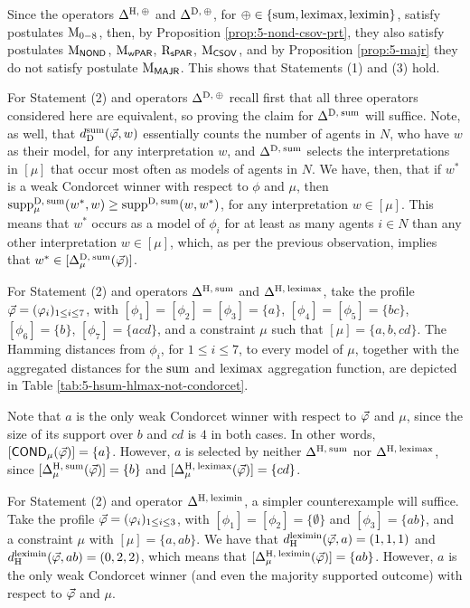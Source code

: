 \begin{prf*}{}{}%
	Since the operators $\me^{\hamming,\:\agg}$ 
	and $\me^{\drastic,\:\agg}$, 
	for $\agg\in\{\ssum,\leximax,\leximin\}$, 
	satisfy postulates $\ppm{0-8}$, then,
	by Proposition \ref{prop:5-nond-csov-prt}, they 
	also satisfy postulates $\ppm{\NOND}$, $\ppm{\WPRT}$, $\ppr{\SPRT}$, $\ppm{\CSOV}$,
	and by Proposition \ref{prop:5-majr} they do not satisfy 
	postulate $\ppm{\MAJR}$.
	This shows that Statements (1) and (3) hold.

	For Statement (2) and operators $\me^{\drastic,\:\agg}$ recall first that 
	all three operators considered here are equivalent,
	so proving the claim for $\me^{\drastic,\:\ssum}$ will suffice. 
	Note, as well, that $\dd_{\drastic}^{\ssum}(\P,w)$ essentially 
	counts the number of agents in $N$,
	who have $w$ as their model, for any interpretation $w$,
	and $\me^{\drastic,\:\ssum}$ selects the interpretations in $[\mu]$
	that occur most often as models of agents in $N$.
	We have, then, that if $w^{\ast}$ is a weak Condorcet winner with respect 
	to $\phi$ and $\mu$, then $\supp^{\drastic,\:\ssum}_{\mu}(w^{\ast},w)\ge\supp^{\drastic,\:\ssum}(w,w^{\ast})$,
	for any interpretation $w\in[\mu]$.
	This means that $w^{\ast}$ occurs as a model of $\phi_{i}$ for at least as many 
	agents $i\in N$ than any other interpretation $w\in[\mu]$,
	which, as per the previous observation, implies that $w^{\ast}\in[\me^{\drastic,\:\ssum}_{\mu}(\P)]$.	 

	For Statement (2) and operators $\me^{\hamming,\:\ssum}$ and $\me^{\hamming,\:\leximax}$, 
	take the profile $\P=(\phi_i)_{1\le i \le 7}$,
	with $[\phi_{1}]=[\phi_{2}]=[\phi_{3}]=\{a\}$,
	$[\phi_{4}]=[\phi_{5}]=\{bc\}$,
	$[\phi_{6}]=\{b\}$,
	$[\phi_{7}]=\{acd\}$,
	and a constraint $\mu$ such that 
	$[\mu]=\{a,b,cd\}$.
	The Hamming distances from $\phi_{i}$, for $1\le i\le 7$,
	to every model of $\mu$,
	together with the aggregated distances for 
	the $\ssum$ and $\leximax$ aggregation function, 
	are depicted in Table \ref{tab:5-hsum-hlmax-not-condorcet}.

	Note that $a$ is the only weak Condorcet winner with respect to 
	$\P$ and $\mu$, since the size of its support over $b$ and $cd$
	is $4$ in both cases. 
	In other words, $[\COND_{\mu}(\P)]=\{a\}$.
	However, $a$ is selected by neither $\me^{\hamming,\:\ssum}$
	nor $\me^{\hamming,\:\leximax}$, since $[\me^{\hamming,\:\ssum}_{\mu}(\P)]=\{b\}$
	and $[\me^{\hamming,\:\leximax}_{\mu}(\P)]=\{cd\}$.

	For Statement (2) and operator $\me^{\hamming,\:\leximin}$,
	a simpler counterexample will suffice. 
	Take the profile $\P=(\phi_i)_{1\le i \le 3}$,
	with $[\phi_{1}]=[\phi_{2}]=\{\emptyset\}$ and $[\phi_{3}]=\{ab\}$,
	and a constraint $\mu$ with $[\mu]=\{a,ab\}$.
	We have that 
	$\dd_{\hamming}^{\leximin}(\P,a)=(1,1,1)$
	and
	$\dd_{\hamming}^{\leximin}(\P,ab)=(0,2,2)$,
	which means that $[\me^{\hamming,\:\leximin}_{\mu}(\P)]=\{ab\}$.
	However, $a$ is the only weak Condorcet winner 
	(and even the majority supported outcome)
	with respect to $\P$ and $\mu$.
\end{prf*}
